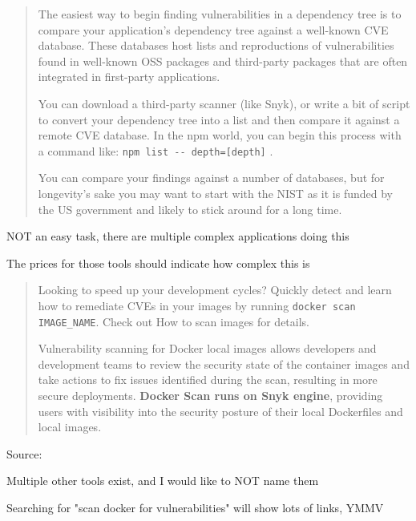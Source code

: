 \documentclass[Screen16to9,17pt]{foils}
\begin{document}


\begin{quote}
The easiest way to begin finding vulnerabilities in a dependency tree is to compare your application’s dependency tree against a well-known CVE database. These databases host lists and reproductions of vulnerabilities found in well-known OSS packages and third-party packages that are often integrated in first-party applications.

You can download a third-party scanner (like Snyk), or write a bit of script to convert your dependency tree into a list and then compare it against a remote CVE database. In the npm world, you can begin this process with a command like: \verb+npm list -- depth=[depth]+ .

You can compare your findings against a number of databases, but for longevity’s
sake you may want to start with the NIST as it is funded by the US government and
likely to stick around for a long time.
\end{quote}

\begin{list2}
\item NOT an easy task, there are multiple complex applications doing this
\item The prices for those tools should indicate how complex this is
\end{list2}





\begin{quote}
Looking to speed up your development cycles? Quickly detect and learn how to remediate CVEs in your images by running \verb+docker scan IMAGE_NAME+. Check out How to scan images for details.

Vulnerability scanning for Docker local images allows developers and development teams to review the security state of the container images and take actions to fix issues identified during the scan, resulting in more secure deployments. {\bf Docker Scan runs on Snyk engine}, providing users with visibility into the security posture of their local Dockerfiles and local images.
\end{quote}
Source: 

\begin{list2}
\item Multiple other tools exist, and I would like to NOT name them
\item Searching for "scan docker for vulnerabilities" will show lots of links, YMMV
\end{list2}
\end{document}
